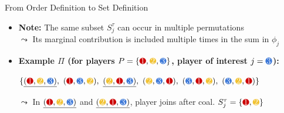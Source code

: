 \documentclass[10pt,compress,t,notes=noshow, xcolor=table]{beamer}
\newcommand{\Stau}{S_{j}^\tau}%
\begin{document}
\begin{frame}{From Order Definition to Set Definition}

\begin{itemize}
\item<1-> \textbf{Note:} The same subset \(\Stau\) can occur in multiple permutations\\
\(\leadsto\) Its marginal contribution is included multiple times in the sum in $\phi_j$

\item<1-> \textbf{Example $\Pi$ (for players \(P = \{\colorcircle{playerred}{white}{1},\colorcircle{playeryellow}{white}{2},\colorcircle{playerblue}{white}{3}\}\), player of interest \(j = \colorcircle{playerblue}{white}{3}\)):}

\smallskip

\(\{
  \underline{\color{black}(\colorcircle{playerred}{white}{1},\colorcircle{playeryellow}{white}{2},\colorcircle{playerblue}{white}{3})},\ 
  (\colorcircle{playerred}{white}{1},\colorcircle{playerblue}{white}{3},\colorcircle{playeryellow}{white}{2}),\ 
 \underline{\color{black}(\colorcircle{playeryellow}{white}{2},\colorcircle{playerred}{white}{1},\colorcircle{playerblue}{white}{3})},\ 
  (\colorcircle{playeryellow}{white}{2},\colorcircle{playerblue}{white}{3},\colorcircle{playerred}{white}{1}),\ 
  (\colorcircle{playerblue}{white}{3},\colorcircle{playerred}{white}{1},\colorcircle{playeryellow}{white}{2}),\ 
  (,\colorcircle{playeryellow}{white}{2},\colorcircle{playerred}{white}{1}) 
\}\)

\smallskip

\(\leadsto\) In \(\underline{\color{black}(\colorcircle{playerred}{white}{1},\colorcircle{playeryellow}{white}{2},\colorcircle{playerblue}{white}{3})}\) and \( \underline{\color{black}(\colorcircle{playeryellow}{white}{2},\colorcircle{playerred}{white}{1},\colorcircle{playerblue}{white}{3})}\), player \colorcircle{playerblue}{white}{3} joins after coal. \({\color{black} \Stau = \{\colorcircle{playerred}{white}{1},\colorcircle{playeryellow}{white}{2}\}}\)


\end{itemize}
\end{frame}
\end{document}
